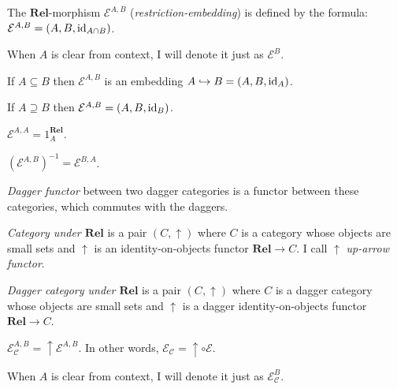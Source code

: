\begin{defn}
  The $\mathbf{Rel}$-morphism $\mathcal{E}^{A,B}$
  (\emph{restriction-embedding}) is defined by the formula: $\mathcal{E}^{A,B}
  = (A , B , \operatorname{id}_{A \cap B})$.
  
  When $A$ is clear from context, I will denote it just as $\mathcal{E}^B$.
\end{defn}

\begin{obvious}
If $A \subseteq B$ then $\mathcal{E}^{A,B}$ is an embedding $A \hookrightarrow B
= (A , B , \operatorname{id}_A)$.
\end{obvious}

\begin{obvious}
If $A \supseteq B$ then $\mathcal{E}^{A,B} = (A , B ,
\operatorname{id}_B)$.
\end{obvious}

\begin{obvious}
$\mathcal{E}^{A,A} = 1^{\mathbf{Rel}}_A$.
\end{obvious}

\begin{obvious}
$(\mathcal{E}^{A,B})^{- 1} = \mathcal{E}^{B,A}$.
\end{obvious}

\begin{defn}
\emph{Dagger functor} between two dagger categories is a functor between
these categories, which commutes with the daggers.
\end{defn}

\begin{defn}
\emph{Category under $\mathbf{Rel}$} is a pair $(C , \uparrow)$
where $C$ is a category whose objects are small sets and $\uparrow$ is an
identity-on-objects functor $\mathbf{Rel} \rightarrow C$. I call
$\uparrow$ \emph{up-arrow functor}.
\end{defn}

\begin{defn}
  \emph{Dagger category under $\mathbf{Rel}$} is a pair $(C ,
  \uparrow)$ where $C$ is a dagger category whose objects are small sets and
  $\uparrow$ is a dagger identity-on-objects functor $\mathbf{Rel}
  \rightarrow C$.
\end{defn}

\begin{defn}
  $\mathcal{E}_{\mathcal{C}}^{A,B} = \uparrow \mathcal{E}^{A,B}$. In
  other words, $\mathcal{E}_{\mathcal{C}} = \uparrow \circ \mathcal{E}$.
  
  When $A$ is clear from context, I will denote it just as $\mathcal{E}_{\mathcal{C}}^B$.
\end{defn}

